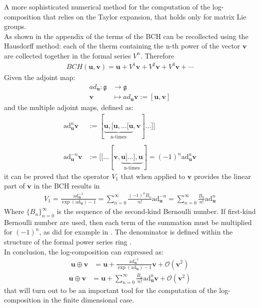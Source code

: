 A more sophisticated numerical method for the computation of the log-composition that relies on the Taylor expansion, that holds only for matrix Lie groups. \\
As shown in the appendix of \cite{klarsfeld1989baker} the terms of the BCH can be recollected using the Hausdorff method: each of the therm containing the n-th power of the vector $\mathbf{v}$ are collected together in the formal series $V^{n}$. Therefore
\begin{align*}
BCH(\mathbf{u},\mathbf{v}) 
= 
\mathbf{u} + V^{1} \mathbf{v} + V^{2} \mathbf{v} + V^{3} \mathbf{v} + \cdots
\end{align*}
Given the adjoint map:
\begin{align*}
ad_{\mathbf{u}} : \mathfrak{g}  & \longrightarrow \mathfrak{g}  
\\
\mathbf{v} &\longmapsto ad_{\mathbf{u}}   \mathbf{v} :=  [\mathbf{u}, \mathbf{v}]
\end{align*}
and the multiple adjoint maps, defined as:
\begin{align*}
\text{ad}_{\mathbf{u}}^{n} \mathbf{v} 
&:= [  \underbrace{   \mathbf{u},[\mathbf{u},... [\mathbf{u}}_{\text{n-times}},\mathbf{v}]...]] 
\\
\\
\text{ad}_{\mathbf{u}}^{-n} \mathbf{v} 
&:= [[...[  \mathbf{v}, \underbrace{   \mathbf{u}]...],\mathbf{u}}_{\text{n-times}}]
= (-1)^n \text{ad}_{\mathbf{u}}^{n} \mathbf{v} 
\end{align*}
it can be proved that the operator $V_{1}$ that when applied to $\mathbf{v}$ provides the linear part of $\mathbf{v}$ in the BCH results in
\begin{align*}
V_{1}
= 
\frac{  
	\text{ad}_{\mathbf{u}}^{-1} 
	}{
	\exp{(\text{ad}_{\mathbf{u}})}-1
	}
=
\sum_{n=0}^{\infty} \frac{(-1)^nB_{n}}{n!} \text{ad}_{\mathbf{u}}^{ - n} 
=
\sum_{n=0}^{\infty} \frac{B_{n}}{n!} \text{ad}_{\mathbf{u}}^{ n} 
\end{align*}
Where $\lbrace B_{n} \rbrace_{n=0}^{\infty} $ is the sequence of the second-kind Bernoulli number. If first-kind Bernoulli number are used, then each term of the summation must be multiplied for $(-1)^{n}$, as did for example in \cite{klarsfeld1989baker}. The denominator is defined within the structure of the formal power series ring \cite{mariconda2013calcolo}.\\
In conclusion, the log-composition can expressed as:
\begin{align*}
\mathbf{u}\oplus \mathbf{v}  
&= 
\mathbf{u} + 
\frac{  
	\text{ad}_{\mathbf{u}}^{-1} 
}{
\exp{(\text{ad}_{\mathbf{u}})}-1
} \mathbf{v}  
+ 
\mathcal{O}(\mathbf{v} ^2) 
\end{align*}
\begin{align}\label{eq:taylor}
\mathbf{u}\oplus \mathbf{v}  
&=
\mathbf{u} 
+
\sum_{n=0}^{\infty} \frac{B_{n}}{n!} \text{ad}_{\mathbf{u}}^{ n} 
\mathbf{v}  
+
\mathcal{O}(\mathbf{v} ^2)
\end{align}
that will turn out to be an important tool for the computation of the log-composition in the finite dimensional case. 

